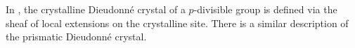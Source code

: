 \documentclass{amsart}
\newcommand{\prism}{{\mathlarger{\mathbbl{\Delta}}}}
\theoremstyle{plain}
\theoremstyle{definition}
\newcommand{\green}[1]{{\color{black}#1}}
\newcommand{\blue}[1]{{\color{black}#1}}
\begin{document}
In \cite{berthelot_breen_messing_theorie_de_dieudonne_cristalline_II}, the crystalline Dieudonn\'e crystal of a $p$-divisible group is defined via the sheaf of local extensions on the crystalline site. There is a similar description of the prismatic Dieudonn\'e crystal.
%
\end{document}
